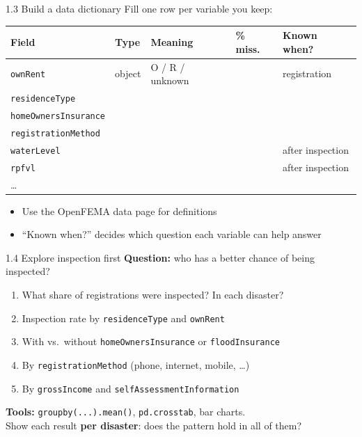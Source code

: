 \documentclass[aspectratio=43,11pt]{beamer}
\begin{document}
\begin{frame}{1.3 Build a data dictionary}
  Fill one row per variable you keep:
  \vspace{0.5em}
  \begin{center}
  \scriptsize
  \begin{tabular}{@{}lllll@{}}
    \toprule
    Field & Type & Meaning & \% miss. & Known when? \\
    \midrule
    \texttt{ownRent} & object & O / R / unknown & & registration \\
    \texttt{residenceType} & & & & \\
    \texttt{homeOwnersInsurance} & & & & \\
    \texttt{registrationMethod} & & & & \\
    \texttt{waterLevel} & & & & after inspection \\
    \texttt{rpfvl} & & & & after inspection \\
    \dots & & & & \\
    \bottomrule
  \end{tabular}
  \end{center}
  \vspace{0.5em}
  \begin{itemize}
    \item Use the OpenFEMA data page for definitions
    \item ``Known when?'' decides which question each variable can help answer
  \end{itemize}
\end{frame}

\begin{frame}{1.4 Explore inspection first}
  \textbf{Question:} who has a better chance of being inspected?
  \vspace{0.5em}
  \begin{enumerate}
    \item What share of registrations were inspected? In each disaster?
    \item Inspection rate by \texttt{residenceType} and \texttt{ownRent}
    \item With vs.\ without \texttt{homeOwnersInsurance} or \texttt{floodInsurance}
    \item By \texttt{registrationMethod} (phone, internet, mobile, \dots)
    \item By \texttt{grossIncome} and \texttt{selfAssessmentInformation}
  \end{enumerate}
  \vspace{0.5em}
  \textbf{Tools:} \texttt{groupby(...).mean()}, \texttt{pd.crosstab},
  bar charts. \\
  Show each result \textbf{per disaster}: does the pattern hold in all of them?
\end{frame}
\end{document}
